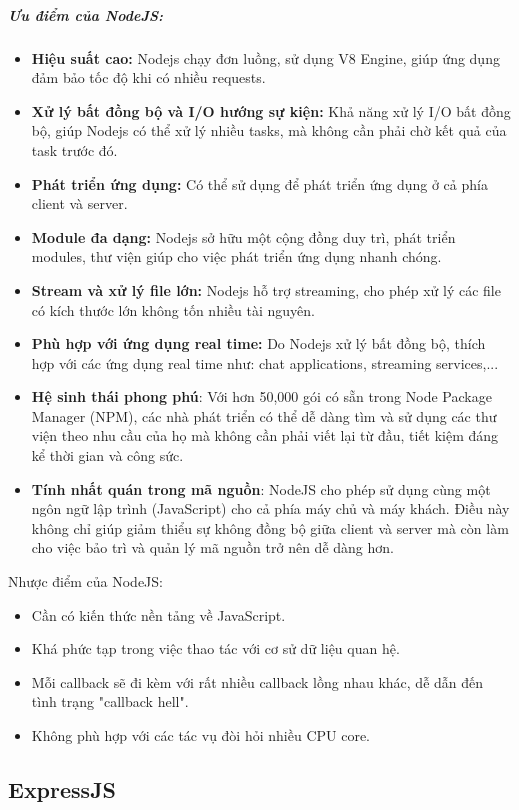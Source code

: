 \subparagraph{Ưu điểm của NodeJS:}
\begin{itemize}
    \item \textbf{Hiệu suất cao:} Nodejs chạy đơn luồng, sử dụng V8 Engine, giúp ứng dụng đảm bảo tốc độ khi có nhiều requests. 
    \item \textbf{Xử lý bất đồng bộ và I/O hướng sự kiện:} Khả năng xử lý I/O bất đồng bộ, giúp Nodejs có thể xử lý nhiều tasks, mà không cần phải chờ kết quả của task trước đó. 
    \item \textbf{Phát triển ứng dụng:} Có thể sử dụng để phát triển ứng dụng ở cả phía client và server. 
    \item \textbf{Module đa dạng:} Nodejs sở hữu một cộng đồng duy trì, phát triển modules, thư viện giúp cho việc phát triển ứng dụng nhanh chóng.
    \item \textbf{Stream và xử lý file lớn:} Nodejs hỗ trợ streaming, cho phép xử lý các file có kích thước lớn không tốn nhiều tài nguyên.
    \item \textbf{Phù hợp với ứng dụng real time:} Do Nodejs xử lý bất đồng bộ, thích hợp với các ứng dụng real time như: chat applications, streaming services,...
    \item \textbf{Hệ sinh thái phong phú}: Với hơn 50,000 gói có sẵn trong Node Package Manager (NPM), các nhà phát triển có thể dễ dàng tìm và sử dụng các thư viện theo nhu cầu của họ mà không cần phải viết lại từ đầu, tiết kiệm đáng kể thời gian và công sức.
    \item \textbf{Tính nhất quán trong mã nguồn}: NodeJS cho phép sử dụng cùng một ngôn ngữ lập trình (JavaScript) cho cả phía máy chủ và máy khách. Điều này không chỉ giúp giảm thiểu sự không đồng bộ giữa client và server mà còn làm cho việc bảo trì và quản lý mã nguồn trở nên dễ dàng hơn.
 
\end{itemize}

Nhược điểm của NodeJS:
\begin{itemize}
    \item Cần có kiến thức nền tảng về JavaScript.
    \item Khá phức tạp trong việc thao tác với cơ sử dữ liệu quan hệ.
    \item Mỗi callback sẽ đi kèm với rất nhiều callback lồng nhau khác, dễ dẫn đến tình trạng "callback hell".
    \item Không phù hợp với các tác vụ đòi hỏi nhiều CPU core.
\end{itemize}

\subsection{ExpressJS}

